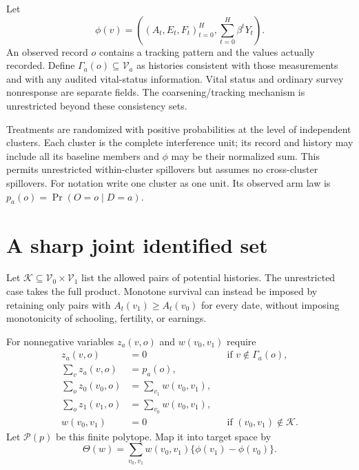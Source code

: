 \documentclass[11pt]{article}
\theoremstyle{remark}
\begin{document}
Let
\[
 \phi(v)=\left((A_t,E_t,F_t)_{t=0}^H,
                    \sum_{t=0}^H\beta^tY_t\right).
\]
An observed record $o$ contains a tracking pattern and the values actually recorded. Define $\Gamma_a(o)\subseteq\mathcal V_a$ as histories consistent with those measurements and with any audited vital-status information. Vital status and ordinary survey nonresponse are separate fields. The coarsening/tracking mechanism is unrestricted beyond these consistency sets.

Treatments are randomized with positive probabilities at the level of independent clusters. Each cluster is the complete interference unit; its record and history may include all its baseline members and $\phi$ may be their normalized sum. This permits unrestricted within-cluster spillovers but assumes no cross-cluster spillovers. For notation write one cluster as one unit. Its observed arm law is $p_a(o)=\Pr(O=o\mid D=a)$.

\section{A sharp joint identified set}
Let $\mathcal K\subseteq\mathcal V_0\times\mathcal V_1$ list the allowed pairs of potential histories. The unrestricted case takes the full product. Monotone survival can instead be imposed by retaining only pairs with $A_t(v_1)\geq A_t(v_0)$ for every date, without imposing monotonicity of schooling, fertility, or earnings.

For nonnegative variables $z_a(v,o)$ and $w(v_0,v_1)$ require
\begin{align}
 z_a(v,o)&=0&&\text{if }v\notin\Gamma_a(o),\label{consistency}\\
 \sum_vz_a(v,o)&=p_a(o),\label{observed}\\
 \sum_o z_0(v_0,o)&=\sum_{v_1}w(v_0,v_1),\label{marginzero}\\
 \sum_o z_1(v_1,o)&=\sum_{v_0}w(v_0,v_1),\label{marginone}\\
 w(v_0,v_1)&=0&&\text{if }(v_0,v_1)\notin\mathcal K.\label{pair}
\end{align}
Let $\mathcal P(p)$ be this finite polytope. Map it into target space by
\[
 \Theta(w)=\sum_{v_0,v_1}w(v_0,v_1)
                            \{\phi(v_1)-\phi(v_0)\}.
\]
\end{document}
